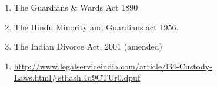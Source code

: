 \begin{multicols}{2}
\begin{enumerate}
\item The Guardians \& Wards Act 1890

\item The Hindu Minority and Guardians act 1956.

\item The Indian Divorce Act, 2001 (amended) 
\end{enumerate}

\vspace{-.3cm}


\vspace{-.3cm}

\begin{enumerate}
\item \url{http://www.legalserviceindia.com/article/l34-Custody-Laws.html#sthash.4d9CTUr0.dpuf}
\end{enumerate}
\end{multicols}
